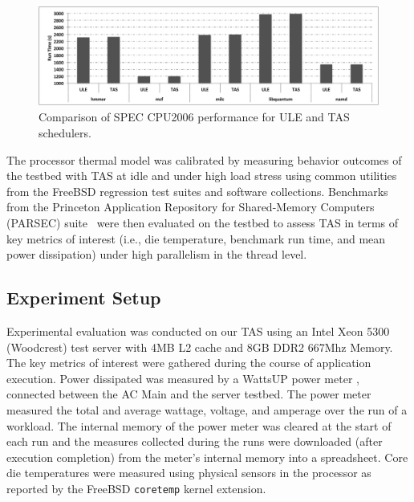 \documentclass[times, 10pt,twocolumn]{IEEEtran}
\begin{document}
\begin{figure}[!t]
  \centering
  \includegraphics[width=1.0\linewidth,height=1.3in]{speccpuperformance}
  \caption{Comparison of SPEC CPU2006 performance for ULE and TAS schedulers.}
  \label{fig:speccpuperf}
\end{figure}
The processor thermal model was calibrated by measuring behavior
outcomes of the testbed with TAS at idle and under high load stress
using common utilities from the FreeBSD regression test suites and
software collections.  Benchmarks from the Princeton Application
Repository for Shared-Memory Computers (PARSEC) suite~\cite{Bienia2011}
were then evaluated on the testbed to assess TAS in terms of key metrics
of interest (i.e., die temperature, benchmark run time, and mean power
dissipation) under high parallelism in the thread level.

\subsection{Experiment Setup}
\label{sec:experiment-setup} 
Experimental evaluation was conducted on our TAS using an Intel Xeon 5300
(Woodcrest) test server with 4MB L2 cache and 8GB DDR2 667Mhz Memory.
The key metrics of interest were gathered during the course of
application execution.  Power dissipated was measured by a WattsUP power
meter \cite{WattsUp2006a}, connected between the AC Main and the server
testbed.  The power meter measured the total and average wattage,
voltage, and amperage over the run of a workload.  The internal memory
of the power meter was cleared at the start of each run and the measures
collected during the runs were downloaded (after execution completion)
from the meter's internal memory into a spreadsheet.   Core die
temperatures were measured using physical sensors in the processor as
reported by the FreeBSD \texttt{coretemp} kernel extension.
\end{document}
